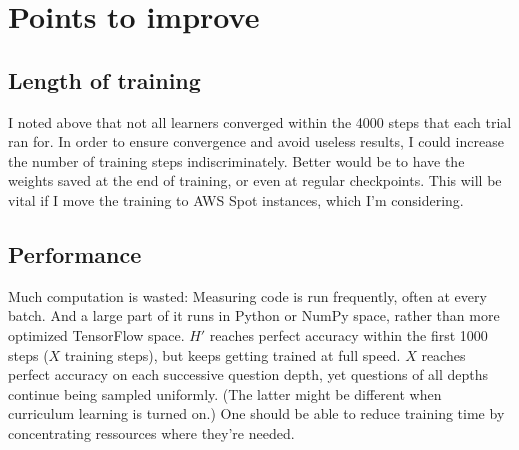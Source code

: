 \documentclass{farlamp}
\begin{document}
\section{Points to improve}

\subsection{Length of training}

I noted above that not all learners converged within the 4000 steps that each
trial ran for. In order to ensure convergence and avoid useless results, I could
increase the number of training steps indiscriminately. Better would be to have
the weights saved at the end of training, or even at regular checkpoints. This
will be vital if I move the training to AWS Spot instances, which I'm
considering.


\subsection{Performance}

Much computation is wasted: Measuring code is run frequently, often at every
batch. And a large part of it runs in Python or NumPy space, rather than more
optimized TensorFlow space. $H'$ reaches perfect accuracy within the first 1000
steps ($X$ training steps), but keeps getting trained at full speed. $X$ reaches
perfect accuracy on each successive question depth, yet questions of all depths
continue being sampled uniformly. (The latter might be different when curriculum
learning is turned on.) One should be able to reduce training time by
concentrating ressources where they're needed.
\end{document}
